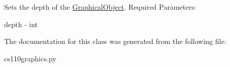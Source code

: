 Sets the depth of the \hyperlink{classcs110graphics_1_1GraphicalObject}{GraphicalObject}. Required Parameters:
\begin{DoxyItemize}
\item depth -\/ int 
\end{DoxyItemize}

The documentation for this class was generated from the following file:\begin{DoxyCompactItemize}
\item 
cs110graphics.py\end{DoxyCompactItemize}
